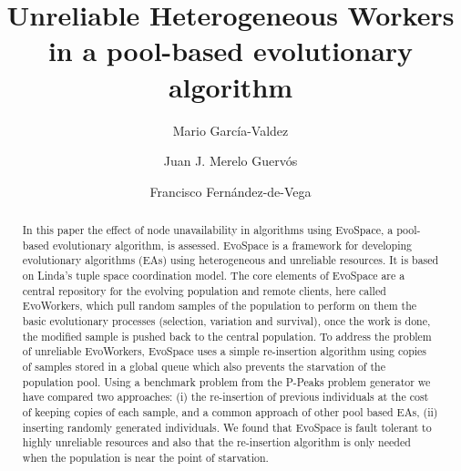 \documentclass{llncs}
\begin{document}
\title{ Unreliable Heterogeneous Workers in a pool-based evolutionary algorithm }
%
%
\author{Mario Garc\'ia-Valdez \and
Juan J. Merelo Guerv\'os  \and  Francisco Fern\'andez-de-Vega  }



\maketitle              %

\begin{abstract}
	In this paper the effect of node unavailability in algorithms using
	EvoSpace, a pool-based evolutionary algorithm, is assessed. EvoSpace is
	a framework for developing evolutionary algorithms (EAs) using 
	heterogeneous and unreliable resources. It is based on Linda's tuple
	space coordination model. The core elements of EvoSpace are a central 
	repository for the evolving population and remote clients, here called EvoWorkers,
	which pull random samples of the population to perform on them the basic evolutionary
	processes (selection, variation and survival), once the work is done, the
	modified sample is pushed back to the central population. To address the problem 
	of unreliable EvoWorkers, EvoSpace uses a simple re-insertion algorithm using copies of
	samples stored in a global queue which also prevents the starvation of the population pool.
	Using a benchmark problem from the P-Peaks problem generator
        we have compared two approaches: 
	(i) the re-insertion of previous individuals at the cost of keeping copies of each sample, 
	and a common approach of other pool based EAs, (ii) inserting  randomly generated
	individuals. We found that EvoSpace is fault tolerant to highly unreliable resources and
	also that the re-insertion algorithm is only needed when the population is near the point of starvation.
\end{abstract}
%
\end{document}

